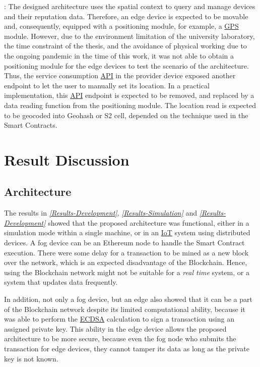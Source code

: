 \npara {}:
The designed architecture uses the spatial context to query and manage devices and their reputation data.
Therefore, an edge device is expected to be movable and, consequently, equipped with a positioning module, for example, a \hyperref[Acronym-GPS]{GPS} module.
However, due to the environment limitation of the university laboratory, the time constraint of the thesis, and the avoidance of physical working due to the ongoing pandemic in the time of this work, it was not able to obtain a positioning module for the edge devices to test the scenario of the architecture.
Thus, the service consumption \hyperref[Acronym-API]{API} in the provider device exposed another endpoint to let the user to manually set its location.
In a practical implementation, this \hyperref[Acronym-API]{API} endpoint is expected to be removed, and replaced by a data reading function from the positioning module.
The location read is expected to be geocoded into Geohash or S2 cell, depended on the technique used in the Smart Contracts.

\section*{Result Discussion} \label{Conclusion-Disscusion}

\subsection*{Architecture} \label{Conclusion-Discussion-Architecture}

\npara The results in \textit{\ref{Results-Development}}, \textit{\ref{Results-Simulation}} and \textit{\ref{Results-Development}} showed that the proposed architecture was functional, either in a simulation mode within a single machine, or in an \hyperref[Acronym-IoT]{IoT} system using distributed devices.
A fog device can be an Ethereum node to handle the Smart Contract execution.
There were some delay for a transaction to be mined as a new block over the network, which is an expected disadvantage of the Blockchain.
Hence, using the Blockchain network might not be suitable for a \textit{real time} system, or a system that updates data frequently.

\npara In addition, not only a fog device, but an edge also showed that it can be a part of the Blockchain network despite its limited computational ability, because it was able to perform the \hyperref[Acronym-ECDSA]{ECDSA} calculation to sign a transaction using an assigned private key.
This ability in the edge device allows the proposed architecture to be more secure, because even the fog node who submits the transaction for edge devices, they cannot tamper its data as long as the private key is not known.

